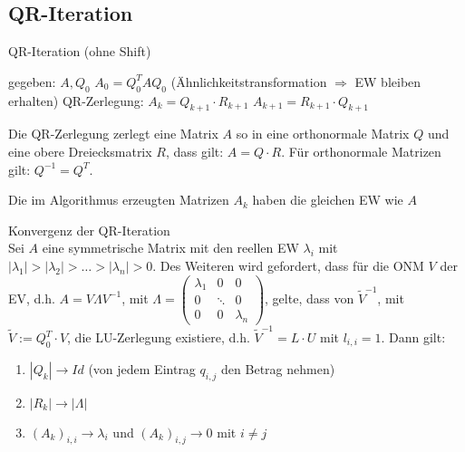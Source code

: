 \subsection{QR-Iteration}
\begin{algorithm}
	\caption{QR-Iteration (ohne Shift)}
	\begin{algorithmic}
		\STATE gegeben: $A,Q_{0}$
		\STATE $A_{0}=Q_{0}^{T}AQ_{0}$ (Ähnlichkeitstransformation $\Rightarrow$ EW bleiben erhalten)
			\STATE QR-Zerlegung: $A_{k}=Q_{k+1}\cdot R_{k+1}$
			\STATE $A_{k+1}=R_{k+1}\cdot Q_{k+1}$
		\ENDFOR
	\end{algorithmic}
\end{algorithm}

\begin{remark}
	Die QR-Zerlegung zerlegt eine Matrix $A$ so in eine orthonormale Matrix $Q$ und eine obere Dreiecksmatrix $R$, dass gilt: $A=Q\cdot R$.
	Für orthonormale Matrizen gilt: $Q^{-1}=Q^{T}$.
\end{remark}

\begin{theorem}
[Satz II.2] Die im Algorithmus erzeugten Matrizen $A_{k}$ haben die gleichen EW wie $A$
\end{theorem}

\begin{theorem}
[Satz II.3] Konvergenz der QR-Iteration
\\
Sei $A$ eine symmetrische Matrix mit den reellen EW $\lambda_{i}$ mit $|\lambda_{1}|>|\lambda_{2}|>\ldots > |\lambda_{n}| > 0$.
Des Weiteren wird gefordert, dass für die ONM $V$ der EV, d.h. $A=V\Lambda V^{-1}$, mit $\Lambda=\left(
	\begin{array}{ccc}
		\lambda_{1} & 0 & 0\\
		0 &\ddots & 0 \\
		0 & 0 & \lambda_{n}
	\end{array}
	\right)$, gelte, dass von $\tilde V^{-1}$, mit $\tilde V:=Q_{0}^{T}\cdot V$, 
	die LU-Zerlegung existiere, d.h. $\tilde V^{-1}=L\cdot U$ mit $l_{i,i}=1$.
	Dann gilt:
	\begin{enumerate}
		\item $|Q_{k}|\rightarrow Id$ (von jedem Eintrag $q_{i,j}$ den Betrag nehmen)
		\item $|R_{k}|\rightarrow |\Lambda|$
		\item $(A_{k})_{i,i}\rightarrow \lambda_{i}$ und $(A_{k})_{i,j} \rightarrow 0$ mit $i \not = j$
	\end{enumerate}
\end{theorem}

